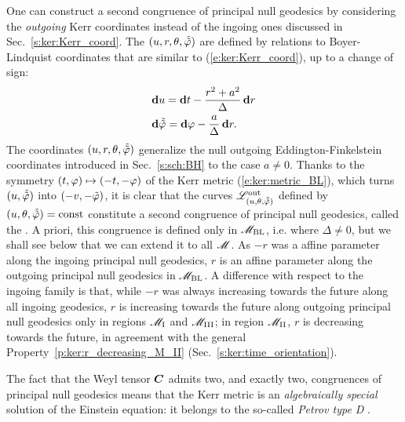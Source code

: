 One can construct a second congruence of principal null geodesics by considering
the \emph{outgoing} Kerr coordinates instead of the ingoing ones
discussed in Sec.~\ref{s:ker:Kerr_coord}. The
$(u,r,\theta,\tilde{{\tilde\varphi}})$ are defined by relations to Boyer-Lindquist
coordinates that are similar to
(\ref{e:ker:Kerr_coord}), up to a change of sign:
\begin{subequations}
\label{e:ker:out_Kerr_coord}
\begin{align}
& \mathbf{d} u = \mathbf{d} t - \frac{r^2+a^2}{\Delta} \, \mathbf{d} r \\
& \mathbf{d} \tilde{{\tilde\varphi}} = \mathbf{d} \varphi - \frac{a}{\Delta}\, \mathbf{d} r .
\end{align}
\end{subequations}
The coordinates $(u,r,\theta,\tilde{{\tilde\varphi}})$ generalize the null
outgoing Eddington-Finkelstein
coordinates introduced in Sec.~\ref{s:sch:BH} to the case $a\not=0$.
Thanks to the symmetry $(t,\varphi)\mapsto(-t,-\varphi)$ of the Kerr metric (\ref{e:ker:metric_BL}), which turns $(u,\tilde{{\tilde\varphi}})$ into $(-v,-{\tilde\varphi})$, it is clear that the
curves $\mathscr{L}^{\rm out}_{(u,\theta,\tilde{{\tilde\varphi}})}$
defined by $(u,\theta,\tilde{{\tilde\varphi}})=\mathrm{const}$ constitute a second
congruence of principal null geodesics, called the .
A priori, this congruence is defined only in $\mathscr{M}_{\rm BL}$, i.e. where $\Delta\neq 0$,
but we shall see below that we can extend it to all $\mathscr{M}$.
As $-r$ was a affine parameter along
the ingoing principal null geodesics, $r$ is an affine parameter along
the outgoing principal null geodesics in $\mathscr{M}_{\rm BL}$.
A difference with respect to the ingoing family is that, while $-r$ was always
increasing towards the future along all ingoing geodesics,
 $r$ is increasing towards the future
along outgoing principal null geodesics only in regions
$\mathscr{M}_{\rm I}$ and $\mathscr{M}_{\rm III}$; in region $\mathscr{M}_{\rm II}$,
$r$ is decreasing towards the future, in agreement with the general
Property~\ref{p:ker:r_decreasing_M_II} (Sec.~\ref{s:ker:time_orientation}).

The fact that the Weyl tensor $\bm{C}$
admits two, and exactly two, congruences of principal null geodesics
means that the Kerr metric is an \emph{algebraically special} solution of
the Einstein equation: it belongs to the so-called \emph{Petrov type D}
\cite{ONeil95}.

